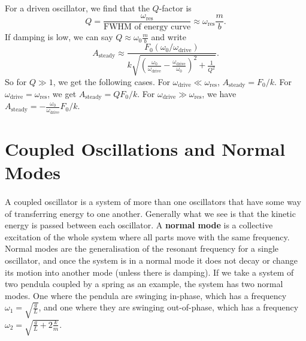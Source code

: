 \documentclass[../classical_mechanics.tex]{subfiles}
\begin{document}
        \paragraph{}
        For a driven oscillator, we find that the $Q$-factor is
        \begin{equation}
            Q=\frac{\omega_\text{res}}{\text{FWHM of energy curve}}\approx\omega_\text{res}\frac{m}{b}.
        \end{equation}
        If damping is low, we can say $Q\approx\omega_0\frac{m}{b}$ and write
        \begin{equation}
            A_\text{steady}\approx\frac{F_0(\omega_0/\omega_\text{drive})}{k\sqrt{\left(\frac{\omega_0}{\omega_\text{drive}}-\frac{\omega_\text{drive}}{\omega_0}\right)^2+\frac{1}{Q^2}}}.
        \end{equation}
        So for $Q\gg 1$, we get the following cases.
        For $\omega_\text{drive}\ll\omega_\text{res}$, $A_\text{steady}=F_0/k$.
        For $\omega_\text{drive}=\omega_\text{res}$, we get $A_\text{steady}=QF_0/k$.
        For $\omega_\text{drive}\gg\omega_\text{res}$, we have $A_\text{steady}=-\frac{\omega_0}{\omega_\text{drive}}F_0/k$.

    \section{Coupled Oscillations and Normal Modes}\label{sec:coupled-oscillations-and-normal-modes}
        \paragraph{}
        A coupled oscillator is a system of more than one oscillators that have some way of transferring energy to one another.
        Generally what we see is that the kinetic energy is passed between each oscillator.
        A \textbf{normal mode} is a collective excitation of the whole system where all parts move with the same frequency.
        Normal modes are the generalisation of the resonant frequency for a single oscillator, and once the system is in a normal mode it does not decay or change its motion into another mode (unless there is damping).
        If we take a system of two pendula coupled by a spring as an example, the system has two normal modes.
        One where the pendula are swinging in-phase, which has a frequency $\omega_1=\sqrt{\frac{g}{L}}$, and one where they are swinging out-of-phase, which has a frequency $\omega_2=\sqrt{\frac{g}{L}+2\frac{k}{m}}$.
\end{document}
